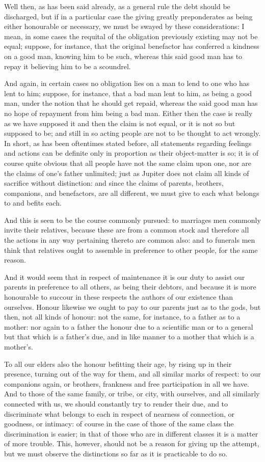 Well then, as has been said already, as a general rule the debt
should be discharged, but if in a particular case the giving greatly
preponderates as being either honourable or necessary, we must be swayed
by these considerations: I mean, in some cases the requital of the
obligation previously existing may not be equal; suppose, for instance,
that the original benefactor has conferred a kindness on a good man,
knowing him to be such, whereas this said good man has to repay it
believing him to be a scoundrel.

And again, in certain cases no obligation lies on a man to lend to one
who has lent to him; suppose, for instance, that a bad man lent to him,
as being a good man, under the notion that he should get repaid, whereas
the said good man has no hope of repayment from him being a bad man.
Either then the case is really as we have supposed it and then the claim
is not equal, or it is not so but supposed to be; and still in so acting
people are not to be thought to act wrongly. In short, as has been
oftentimes stated before, all statements regarding feelings and actions
can be definite only in proportion as their object-matter is so; it is
of course quite obvious that all people have not the same claim upon
one, nor are the claims of one's father unlimited; just as Jupiter does
not claim all kinds of sacrifice without distinction: and since the
claims of parents, brothers, companions, and benefactors, are all
different, we must give to each what belongs to and befits each.

And this is seen to be the course commonly pursued: to marriages men
commonly invite their relatives, because these are from a common stock
and therefore all the actions in any way pertaining thereto are common
also: and to funerals men think that relatives ought to assemble in
preference to other people, for the same reason.

And it would seem that in respect of maintenance it is our duty to
assist our parents in preference to all others, as being their debtors,
and because it is more honourable to succour in these respects the
authors of our existence than ourselves. Honour likewise we ought to pay
to our parents just as to the gods, but then, not all kinds of honour:
not the same, for instance, to a father as to a mother: nor again to a
father the honour due to a scientific man or to a general but that
which is a father's due, and in like manner to a mother that which is a
mother's.

To all our elders also the honour befitting their age, by rising up in
their presence, turning out of the way for them, and all similar marks
of respect: to our companions again, or brothers, frankness and free
participation in all we have. And to those of the same family, or tribe,
or city, with ourselves, and all similarly connected with us, we should
constantly try to render their due, and to discriminate what belongs to
each in respect of nearness of connection, or goodness, or intimacy:
of course in the case of those of the same class the discrimination is
easier; in that of those who are in different classes it is a matter of
more trouble. This, however, should not be a reason for giving up
the attempt, but we must observe the distinctions so far as it is
practicable to do so.

